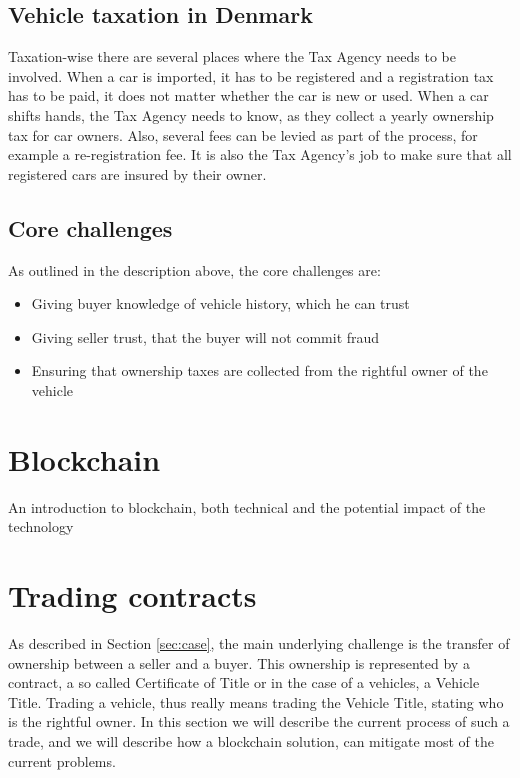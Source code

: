 \documentclass[oneside,a4paper,10pts,article]{memoir}
\begin{document}
\section{Vehicle taxation in Denmark}
Taxation-wise there are several places where the Tax Agency needs to
be involved. When a car is imported, it has to be registered and a
registration tax has to be paid, it does not matter whether the car is
new or used. When a car shifts hands, the Tax Agency needs to know, as
they collect a yearly ownership tax for car owners. Also, several fees
can be levied as part of the process, for example a re-registration
fee. It is also the Tax Agency's job to make sure that all registered
cars are insured by their owner.

\section{Core challenges}
As outlined in the description above, the core challenges are:

\begin{itemize}
\item Giving buyer knowledge of vehicle history, which he can trust
\item Giving seller trust, that the buyer will not commit fraud
\item Ensuring that ownership taxes are collected from the rightful
  owner of the vehicle
\end{itemize}

\chapter{Blockchain}
\label{sec:blockchain}
An introduction to blockchain, both technical and the potential impact
of the technology

\chapter{Trading contracts}
\label{sec:trading}
As described in Section \ref{sec:case}, the main underlying challenge
is the transfer of ownership between a seller and a buyer. This
ownership is represented by a contract, a so called Certificate of
Title or in the case of a vehicles, a Vehicle Title. Trading a
vehicle, thus really means trading the Vehicle Title, stating who is
the rightful owner. In this section we will describe the current
process of such a trade, and we will describe how a blockchain
solution, can mitigate most of the current problems.
\end{document}
